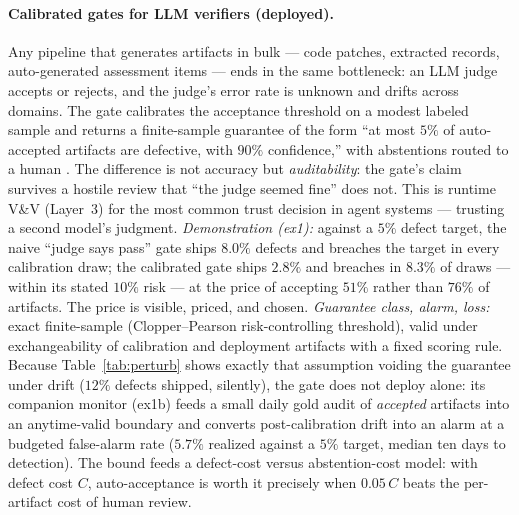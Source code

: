 \documentclass[11pt,a4paper]{article}
\begin{document}
\paragraph{Calibrated gates for LLM verifiers (deployed).} Any pipeline
that generates artifacts in bulk --- code patches, extracted records,
auto-generated assessment items --- ends in the same bottleneck: an LLM
judge accepts or rejects, and the judge's error rate is unknown and drifts
across domains. The  gate calibrates the acceptance
threshold on a modest labeled sample and returns a finite-sample guarantee
of the form ``at most $5\%$ of auto-accepted artifacts are defective, with
$90\%$ confidence,'' with abstentions routed to a human
\citep{vovk2005,angelopoulos2023gentle}. The difference is not accuracy but
\emph{auditability}: the gate's claim survives a hostile review that ``the
judge seemed fine'' does not. This is runtime V\&V (Layer~3) for the most
common trust decision in agent systems --- trusting a second model's
judgment. \emph{Demonstration (ex1):} against a $5\%$ defect target, the
naive ``judge says pass'' gate ships $8.0\%$ defects and breaches the
target in every calibration draw; the calibrated gate ships $2.8\%$ and
breaches in $8.3\%$ of draws --- within its stated $10\%$ risk --- at the
price of accepting $51\%$ rather than $76\%$ of artifacts. The price is
visible, priced, and chosen. \emph{Guarantee class, alarm, loss:} exact
finite-sample (Clopper--Pearson risk-controlling threshold), valid under
exchangeability of calibration and deployment artifacts with a fixed
scoring rule. Because Table~\ref{tab:perturb} shows exactly that
assumption voiding the guarantee under drift ($12\%$ defects shipped,
silently), the gate does not deploy alone: its companion monitor (ex1b)
feeds a small daily gold audit of \emph{accepted} artifacts into an
anytime-valid boundary and converts post-calibration drift into an alarm
at a budgeted false-alarm rate ($5.7\%$ realized against a $5\%$ target,
median ten days to detection). The bound feeds a defect-cost versus
abstention-cost model: with defect cost $C$, auto-acceptance is worth it
precisely when $0.05\,C$ beats the per-artifact cost of human review.
\end{document}
